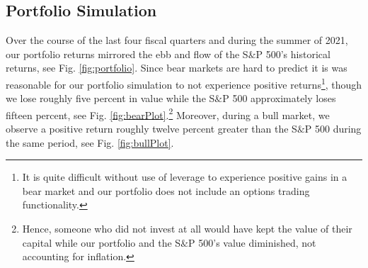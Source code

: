 \documentclass{article}
\begin{document}
\subsection{Portfolio Simulation}
Over the course of the last four fiscal quarters and during the summer of 2021, our portfolio returns mirrored the ebb and flow of the S$\&$P 500's historical returns, see Fig. \ref{fig:portfolio}. Since bear markets are hard to predict it is was reasonable for our portfolio simulation to not experience positive returns\footnote{It is quite difficult without use of leverage to experience positive gains in a bear market and our portfolio does not include an options trading functionality.}, though we lose roughly five percent in value while the S$\&$P 500 approximately loses fifteen percent, see Fig. \ref{fig:bearPlot}.\footnote{Hence, someone who did not invest at all would have kept the value of their capital while our portfolio and the S$\&$P 500's value diminished, not accounting for inflation.} Moreover, during a bull market, we observe a positive return roughly twelve percent greater than the S$\&$P 500 during the same period, see Fig. \ref{fig:bullPlot}.
\end{document}

